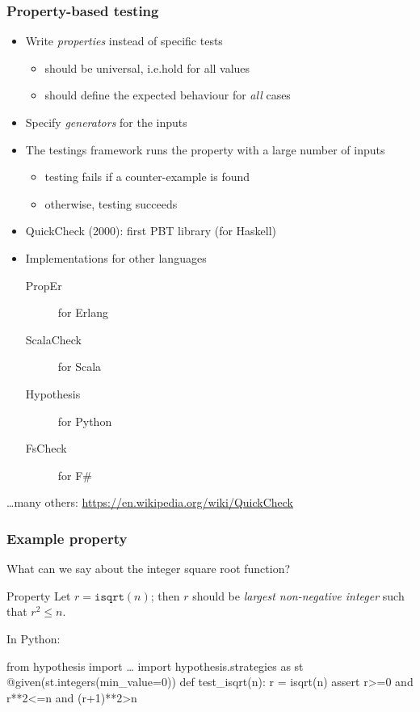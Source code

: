 \documentclass{beamer}
\begin{document}
\begin{frame}[allowframebreaks]
  \frametitle{Property-based testing}

\begin{itemize}
\item Write \emph{properties} instead of specific tests
\begin{itemize}
\item should be universal, i.e.\@ hold for all values
\item should define the expected behaviour for \emph{all} cases
\end{itemize}
\item Specify \emph{generators} for the inputs
\item The testings framework runs the property with
  a large number of inputs
  \begin{itemize}
  \item testing fails if a \alert{counter-example} is found
  \item otherwise, testing succeeds
  \end{itemize}
\end{itemize}

\framebreak

\begin{itemize}
\item QuickCheck (2000): first PBT library (for Haskell)
\item Implementations for other languages
  \begin{description}
    \item[PropEr] for Erlang
  \item[ScalaCheck] for Scala
  \item[Hypothesis] for Python
  \item[FsCheck] for F\#
  \end{description}
\end{itemize}

\ldots many others: \url{https://en.wikipedia.org/wiki/QuickCheck}
\end{frame}


\begin{frame}[fragile]
  \frametitle{Example property}

  What can we say about the integer square root function?
  \pause
  \medskip

  \begin{block}{Property}
    Let $r = \texttt{isqrt}(n)$; then
  $r$ should be \emph{largest non-negative integer} such that
  $r^2 \leq n$.
  \end{block}
  \pause
  \medskip

  In Python:
\begin{semiverbatim}
from hypothesis import \ldots
import hypothesis.strategies as st
@given(\alert<5>{st.integers(min_value=0)})  
def test_isqrt(\alert<4>{n}):                
    r = isqrt(n)
    assert \alert<6>{r>=0 and r**2<=n and (r+1)**2>n}   
  \end{semiverbatim}

\end{frame}
\end{document}
